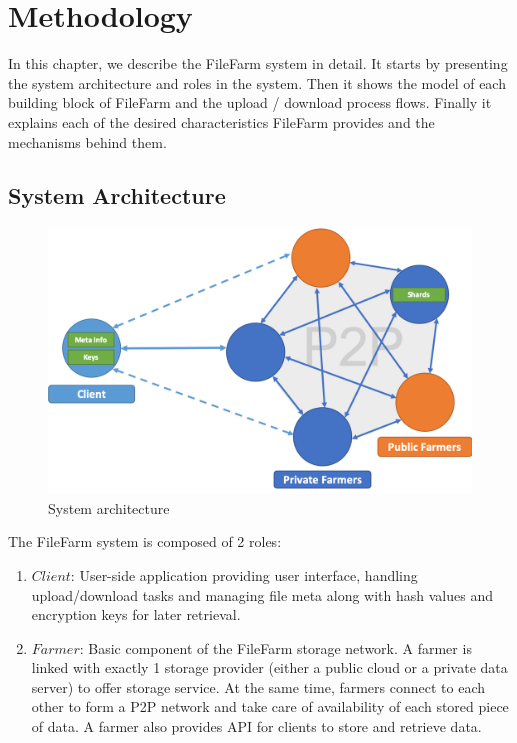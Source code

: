 \chapter{Methodology}
\label{c:methodology}

In this chapter, we describe the FileFarm system in detail. It starts by presenting the system architecture and roles in the system. Then it shows the model of each building block of FileFarm and the upload / download process flows. Finally it explains each of the desired characteristics FileFarm provides and the mechanisms behind them.

\section{System Architecture}
\label{s:systemarchitecture}

\begin{figure}[hbt]
\centering
  \includegraphics[width=15cm]{figures/system_architecture.png}
  \caption{System architecture}
  \label{fig:systemarchitecture}
\end{figure}

\newpage

The FileFarm system is composed of 2 roles:

\begin{enumerate}
  \item $Client$: User-side application providing user interface, handling upload/download tasks and managing file meta along with hash values and encryption keys for later retrieval.
  \item $Farmer$: Basic component of the FileFarm storage network. A farmer is linked with exactly 1 storage provider (either a public cloud or a private data server) to offer storage service. At the same time, farmers connect to each other to form a P2P network and take care of availability of each stored piece of data. A farmer also provides API for clients to store and retrieve data.
\end{enumerate}

